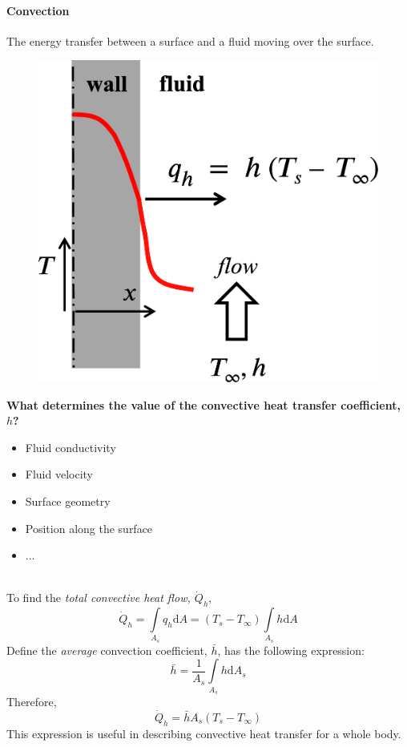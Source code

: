 \documentclass[12pt, a4paper]{article}
\numberwithin{equation}{subsection}
\begin{document}
\paragraph{Convection} The energy transfer between a surface and a fluid moving over the surface.

\begin{minipage}{.4\textwidth}
    \begin{figure}[H]
    \centering
    \includegraphics[width=.9\textwidth]{img/convective_heat_transfer.eps}
    \end{figure}
\end{minipage}\hfill
\begin{minipage}{.6\textwidth}
\textbf{What determines the value of the convective heat transfer coefficient, $h$?}
\begin{itemize}
    \item Fluid conductivity
    \item Fluid velocity
    \item Surface geometry
    \item Position along the surface
    \item ...
\end{itemize}
\end{minipage}
\ \\

To find the \emph{total convective heat flow, $\dot{Q}_{h}$},
\[
    \dot{Q}_{h} = \int\limits_{A_{s}} q_{h}\mathrm{d}A = (T_{s}-T_{\infty})\int\limits_{A_{s}}h\mathrm{d}A
\]
Define the \textit{average} convection coefficient, $\bar{h}$, has the following expression:
\[
    \bar{h} = \frac{1}{A_{s}}\int\limits_{A_{s}}h\mathrm{d}A_{s}
\]
Therefore,
\[
    \dot{Q}_{h} = \bar{h}A_{s}(T_{s}-T_{\infty})
\]
This expression is useful in describing convective heat transfer for a whole body.
\end{document}
